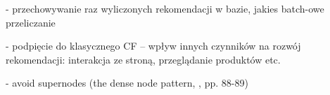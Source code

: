\documentclass[12pt]{report}
\begin{document}
- przechowywanie raz wyliczonych rekomendacji w bazie, jakies batch-owe przeliczanie

- podpięcie do klasycznego CF
-- wpływ innych czynników na rozwój rekomendacji: interakcja ze stroną, przeglądanie produktów etc.

- avoid supernodes (the dense node pattern, \cite{learning_neo4j}, pp. 88-89)


\end{document}
